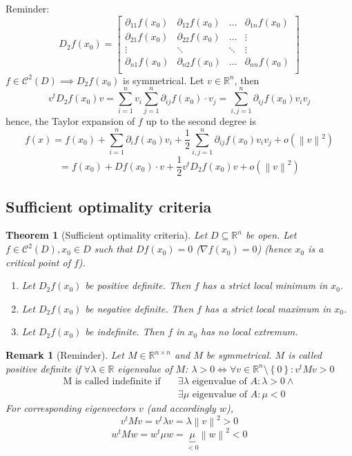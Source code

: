 \documentclass{article}
\newtheorem{theorem}{Theorem}  \numberwithin{theorem}{section}
\newtheorem{remark}{Remark}  \numberwithin{remark}{section}
\newcommand{\set}[1]{\left\{#1\right\}}
\newcommand{\norm}[1]{\left\|#1\right\|}
\begin{document}
Reminder:
\[
  D_2 f(x_0) = \begin{bmatrix}
    \partial_{11} f(x_0) & \partial_{12} f(x_0) & \dots & \partial_{1n} f(x_0) \\
    \partial_{21} f(x_0) & \partial_{22} f(x_0) & \dots & \vdots \\
    \vdots & \ddots & \ddots & \vdots \\
    \partial_{n1} f(x_0) & \partial_{n2} f(x_0) & \dots & \partial_{nn} f(x_0) \\
  \end{bmatrix}
\]
$f \in \mathcal C^2(D) \implies D_2 f(x_0)$ is symmetrical.
Let $v \in \mathbb R^n$, then
\[ v^t D_2 f(x_0) v = \sum_{i=1}^n v_i \sum_{j=1}^n \partial_{ij} f(x_0) \cdot v_j = \sum_{i,j=1}^n \partial_{ij} f(x_0) v_i v_j \]
hence, the Taylor expansion of $f$ up to the second degree is
\[ f(x) = f(x_0) + \sum_{i=1}^n \partial_i f(x_0) v_i + \frac12 \sum_{i,j=1}^n \partial_{ij} f(x_0) v_i v_j + o(\norm{v}^2) \]
\[ = f(x_0) + Df(x_0) \cdot v + \frac12 v^t D_2 f(x_0) v + o(\norm{v}^2) \]

\subsection{Sufficient optimality criteria}

\begin{theorem}[Sufficient optimality criteria] %
  Let $D \subseteq \mathbb R^n$ be open. Let $f \in \mathcal C^2(D), x_0 \in D$
  such that $Df(x_0) = 0$ ($\nabla f(x_0) = 0$) (hence $x_0$ is a critical point of $f$).
  \begin{enumerate}
    \item Let $D_2 f(x_0)$ be positive definite. Then $f$ has a strict local minimum in $x_0$.
    \item Let $D_2 f(x_0)$ be negative definite. Then $f$ has a strict local maximum in $x_0$.
    \item Let $D_2 f(x_0)$ be indefinite. Then $f$ in $x_0$ has no local extremum.
  \end{enumerate}
\end{theorem}

\begin{remark}[Reminder]
  Let $M \in \mathbb R^{n \times n}$ and $M$ be symmetrical. $M$ is called positive definite if $\forall \lambda \in \mathbb R$ eigenvalue of $M$: $\lambda > 0 \iff \forall v \in \mathbb R^n \setminus \set{0}: v^t M v > 0$
  \begin{align*}
    \text{M is called indefinite if} \quad & \exists \lambda \text{ eigenvalue of } A: \lambda > 0 \land \\
    &\exists \mu \text{ eigenvalue of } A: \mu < 0
  \end{align*}
  For corresponding eigenvectors $v$ (and accordingly $w$),
  \[ v^t M v = v^t \lambda v = \lambda \norm{v}^2 > 0 \]
  \[ w^t M w = w^t \mu w = \underbrace{\mu}_{< 0} \norm{w}^2 < 0 \]
\end{remark}
\end{document}
